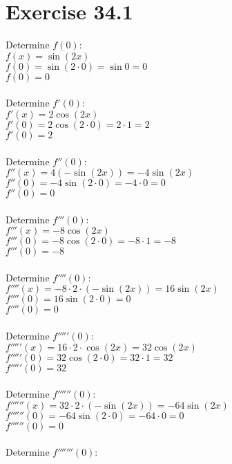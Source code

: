 \documentclass[a4paper, 10pt]{scrartcl}
\begin{document}
\section{Exercise 34.1}

Determine $f(0)$:\\
$f(x) = \sin{(2x)}$\\
$f(0) = \sin{(2 \cdot 0)} = \sin{0} = 0$\\
$f(0) = 0$\\
\\
Determine $f'(0)$:\\
$f'(x) = 2 \cos{(2x)}$\\
$f'(0) = 2 \cos{(2 \cdot 0)} = 2 \cdot 1 = 2$\\
$f'(0) = 2$\\
\\
Determine $f''(0)$:\\
$f''(x) = 4 (- \sin{(2x)}) = -4 \sin{(2x)}$\\
$f''(0) = -4 \sin{(2 \cdot 0)} = -4 \cdot 0 = 0$\\
$f''(0) = 0$\\
\\
Determine $f'''(0)$:\\
$f'''(x) = -8 \cos{(2x)}$\\
$f'''(0) = -8 \cos{(2 \cdot 0)} = -8 \cdot 1 = -8$\\
$f'''(0) = -8$\\
\\
Determine $f''''(0)$:\\
$f''''(x) = -8 \cdot 2 \cdot (- \sin{(2x)}) = 16 \sin{(2x)}$\\
$f''''(0) = 16 \sin{(2 \cdot 0)} = 0$\\
$f''''(0) = 0$\\
\\
Determine $f'''''(0)$:\\
$f'''''(x) = 16 \cdot 2 \cdot \cos{(2x)} = 32 \cos{(2x)}$\\
$f'''''(0) = 32 \cos{(2 \cdot 0)} = 32 \cdot 1 = 32$\\
$f'''''(0) = 32$\\
\\
Determine $f''''''(0)$:\\
$f''''''(x) = 32 \cdot 2 \cdot (- \sin{(2x)}) = -64 \sin{(2x)}$\\
$f''''''(0) = -64 \sin{(2 \cdot 0)} = -64 \cdot 0 = 0$\\
$f''''''(0) = 0$\\
\\
Determine $f'''''''(0)$:\\
\end{document}
